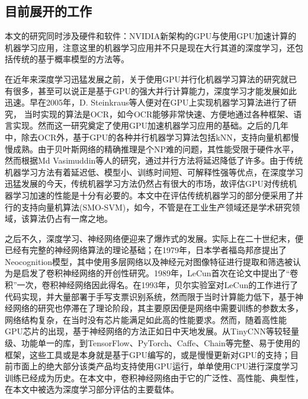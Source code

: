 \subsection{目前展开的工作}
\par 本文的研究同时涉及硬件和软件：NVIDIA新架构的GPU与使用GPU加速计算的机器学习应用，注意这里的机器学习应用并不只是现在大行其道的深度学习，还包括传统的基于概率模型的方法等。
\par 在近年来深度学习迅猛发展之前，关于使用GPU并行化机器学习算法的研究就已有很多，甚至可以说正是基于GPU的强大并行计算能力，深度学习才能发展如此迅速。早在2005年，D. Steinkraus等人便对在GPU上实现机器学习算法进行了研究， 当时实现的算法是OCR，如今OCR能够非常快速、方便地通过各种框架、语言实现。然而这一研究奠定了使用GPU加速机器学习应用的基础\parencite{GPUFORML}。之后的几年中，除去OCR外，基于GPU的各种并行机器学习算法包括kNN\parencite{KNNG}，支持向量机\parencite{SMOSVM}都慢慢成熟。由于贝叶斯网络的精确推理是个NP难的问题，其性能受限于硬件水平，然而根据Md Vasimuddin等人的研究\parencite{BAYESINF}，通过并行方法将延迟降低了许多。由于传统机器学习方法有着延迟低、模型小、训练时间短、可解释性强等优点，在深度学习迅猛发展的今天，传统机器学习方法仍然占有很大的市场，故评估GPU对传统机器学习加速的性能是十分有必要的。本文中在评估传统机器学习的部分便采用了并行的支持向量机算法(SMO-SVM)，如今，不管是在工业生产领域还是学术研究领域，该算法仍占有一席之地。
\par 之后不久，深度学习、神经网络便迎来了爆炸式的发展。实际上在二十世纪末，便已经有完整的神经网络算法的理论基础；在1979年，日本学者福岛邦彦提出了Neocognition模型，其中使用多层网络以及神经元对图像特征进行提取和筛选被认为是启发了卷积神经网络的开创性研究\parencite{JAPANESSAY}。1989年，LeCun首次在论文中提出了“卷积”一次，卷积神经网络因此得名\parencite{LENET}。在1993年，贝尔实验室对LeCun的工作进行了代码实现，并大量部署于手写支票识别系统，然而限于当时计算能力低下，基于神经网络的研究也停滞在了理论阶段，其主要原因便是网络中需要训练的参数太多，网络结构复杂，在当时没有芯片能满足如此高的性能要求\parencite{NNML}。然而，随着高性能GPU芯片的出现，基于神经网络的方法正如日中天地发展。从TinyCNN等较轻量级、功能单一的库，到TensorFlow、PyTorch、Caffe、Chain等完整、易于使用的框架，这些工具或是本身就是基于GPU编写的，或是慢慢更新对GPU的支持；目前市面上的绝大部分该类产品均支持使用GPU运行，单单使用CPU进行深度学习训练已经成为历史。在本文中，卷积神经网络由于它的广泛性、高性能、典型性，在本文中被选为深度学习部分评估的主要载体。

